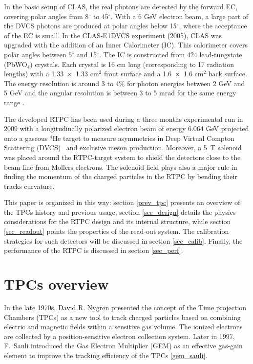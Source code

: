 \documentclass[aps,prl,twocolumn,showpacs,superscriptaddress,groupedaddress]{revtex4}
\begin{document}
In the basic setup of CLAS, the real photons are detected by the forward EC, 
covering polar angles from 8$^{\circ}$ to 45$^{\circ}$. With a 6 GeV electron 
beam, a large part of the DVCS photons are produced at polar angles below 
15$^{\circ}$, where the acceptance of the EC is small. In the CLAS-E1DVCS 
experiment (2005), CLAS was upgraded with the addition of an Inner Calorimeter 
(IC). This calorimeter covers polar angles between 5$^{\circ}$ and 
15$^{\circ}$. The IC is constructed from 424 lead-tungstate (PbWO$_{4}$) 
crystals. Each crystal is 16 cm long (corresponding to 17 radiation lengths) 
with a 1.33~$\times$~1.33 cm$^2$ front surface and a 1.6~$\times$~1.6 cm$^2$ 
back surface. The energy resolution is around 3 to 4$\%$ for photon energies 
between 2 GeV and 5 GeV and the angular resolution is between 3 to 5 mrad for 
the same energy range \cite{Hyon-suk}.

The developed RTPC has been used during a three months experimental run in 2009 
with a longitudinally polarized electron beam of energy 6.064 GeV projected 
onto a gaseous $^{4}$He target to measure asymmetries in Deep Virtual Compton 
Scattering (DVCS)~\cite{proposal} and exclusive meson production. Moreover, a 
5~T solenoid was placed around the RTPC-target system to shield the detectors 
close to the beam line from Mollers electrons. The solenoid field plays also a 
major rule in finding the momentum of the charged particles in the RTPC by 
bending their tracks curvature.

This paper is organized in this way: section \ref{prev_tpc} presents an 
overview of the TPCs history and previous usage, section \ref{sec_design} 
details the physics considerations for the RTPC design and its internal 
structure, while section \ref{sec_readout} points the properties of the 
read-out system.  The calibration strategies for such detectors will be 
discussed in section \ref{sec_calib}. Finally, the performance of the RTPC is 
discussed in section \ref{sec_perf}.

\section{TPCs overview}
In the late 1970s, David R. Nygren presented the concept of the Time projection 
Chambers (TPCs) as a new tool to track charged particles based on combining 
electric and magnetic fields within a sensitive gas volume. The ionized 
electrons are collected by a position-sensitive electron collection system.  
Later in 1997, F.~Sauli introduced the Gas Electron Multiplier (GEM) as an 
effective gas-gain element to improve the tracking efficiency of the TPCs 
\ref{gem_sauli}.  
\end{document}
